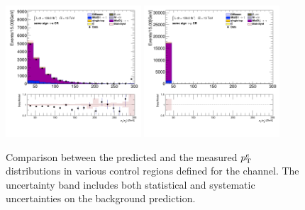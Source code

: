 \begin{figure}[!htp]
\begin{center}
			\includegraphics[width=0.45\textwidth]{chapters/chapter6_HPlus/images/taulep/el_0_pt_SS_TAUEL.png} 
			\includegraphics[width=0.45\textwidth]{chapters/chapter6_HPlus/images/taulep/el_0_pt_SS_TAUMU.png} \\
			\end{center}
			\caption{
			Comparison between the predicted and the measured $p_{\text{T}}^{e}$ distributions in various control regions defined for the \taulep channel. The uncertainty band includes both statistical and systematic uncertainties on the background prediction. 
			}
			\label{fig:bkg-pt-el-taulep}
		\end{figure}

